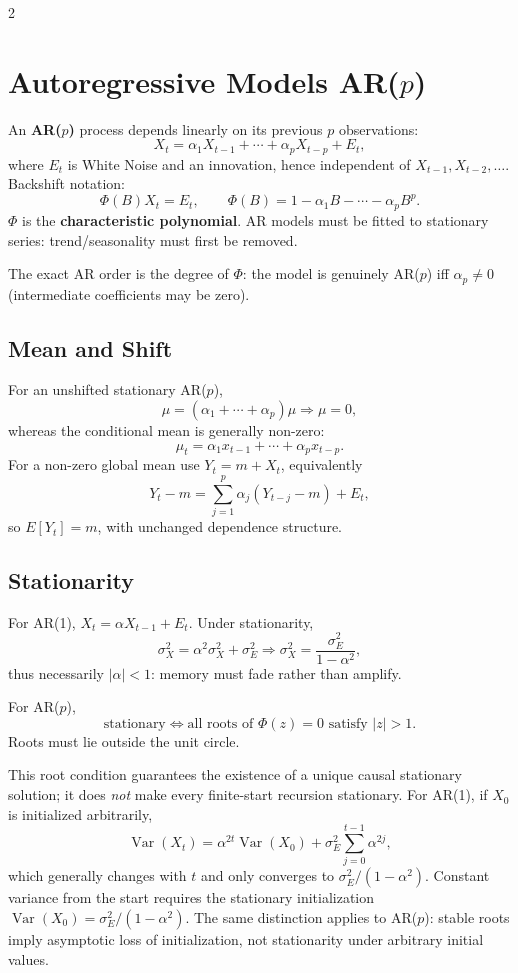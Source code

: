 \documentclass[9pt,a4paper]{extarticle}
\newcommand{\key}[1]{\textbf{#1}}
\begin{document}
\begin{multicols}{2}
\section{Autoregressive Models AR($p$)}

An \key{AR($p$)} process depends linearly on its previous \(p\) observations:
\[
\boxed{X_t=\alpha_1X_{t-1}+\cdots+\alpha_pX_{t-p}+E_t},
\]
where \(E_t\) is White Noise and an innovation, hence independent of \(X_{t-1},X_{t-2},\ldots\). Backshift notation:
\[
\Phi(B)X_t=E_t,\qquad
\Phi(B)=1-\alpha_1B-\cdots-\alpha_pB^p.
\]
\(\Phi\) is the \key{characteristic polynomial}. AR models must be fitted to stationary series: trend/seasonality must first be removed.

The exact AR order is the degree of \(\Phi\): the model is genuinely AR(\(p\)) iff \(\alpha_p\neq0\) (intermediate coefficients may be zero).

\subsection{Mean and Shift}

For an unshifted stationary AR($p$),
\[
\mu=(\alpha_1+\cdots+\alpha_p)\mu\Rightarrow \boxed{\mu=0},
\]
whereas the conditional mean is generally non-zero:
\[
\mu_t=\alpha_1x_{t-1}+\cdots+\alpha_px_{t-p}.
\]
For a non-zero global mean use \(Y_t=m+X_t\), equivalently
\[
\boxed{Y_t-m=\sum_{j=1}^p\alpha_j(Y_{t-j}-m)+E_t},
\]
so \(E[Y_t]=m\), with unchanged dependence structure.

\subsection{Stationarity}

For AR(1), \(X_t=\alpha X_{t-1}+E_t\). Under stationarity,
\[
\sigma_X^2=\alpha^2\sigma_X^2+\sigma_E^2
\Rightarrow
\boxed{\sigma_X^2=\frac{\sigma_E^2}{1-\alpha^2}},
\]
thus necessarily \(\boxed{|\alpha|<1}\): memory must fade rather than amplify.

For AR($p$),
\[
\boxed{\text{stationary}\iff \text{all roots of }\Phi(z)=0\text{ satisfy }|z|>1.}
\]
Roots must lie outside the unit circle.

This root condition guarantees the existence of a unique causal stationary solution; it does \emph{not} make every finite-start recursion stationary. For AR(1), if \(X_0\) is initialized arbitrarily,
\[
\operatorname{Var}(X_t)=\alpha^{2t}\operatorname{Var}(X_0)
+\sigma_E^2\sum_{j=0}^{t-1}\alpha^{2j},
\]
which generally changes with \(t\) and only converges to \(\sigma_E^2/(1-\alpha^2)\). Constant variance from the start requires the stationary initialization \(\operatorname{Var}(X_0)=\sigma_E^2/(1-\alpha^2)\). The same distinction applies to AR($p$): stable roots imply asymptotic loss of initialization, not stationarity under arbitrary initial values.


\end{multicols}
\end{document}
